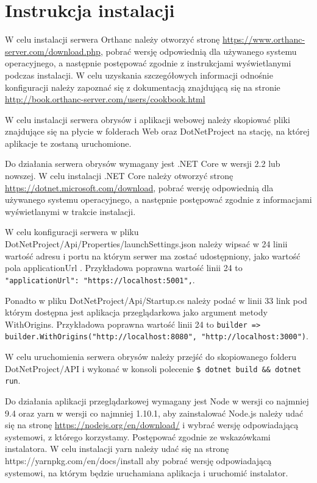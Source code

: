 \documentclass[a4paper,11pt,twoside,openright]{report}
\newcommand\blankpage{%
    \null
    \thispagestyle{empty}%
    \newpage}
\theoremstyle{definition}
\begin{document}



\afterpage{\blankpage}
\chapter*{Instrukcja instalacji}

W celu instalacji serwera Orthanc należy otworzyć stronę \url{https://www.orthanc-server.com/download.php}, pobrać wersję odpowiednią dla używanego systemu operacyjnego, a następnie postępować zgodnie z instrukcjami wyświetlanymi podczas instalacji. W celu uzyskania szczegółowych informacji odnośnie konfiguracji należy zapoznać się z dokumentacją znajdującą się na stronie \url{http://book.orthanc-server.com/users/cookbook.html}

W celu instalacji serwera obrysów i aplikacji webowej należy skopiować pliki znajdujące się na płycie w folderach Web oraz DotNetProject na stację, na której aplikacje te zostaną uruchomione.

Do działania serwera obrysów wymagany jest .NET Core w wersji 2.2 lub nowszej. W celu instalacji .NET Core należy otworzyć stronę \url{https://dotnet.microsoft.com/download}, pobrać wersję odpowiednią dla używanego systemu operacyjnego, a następnie postępować zgodnie z informacjami wyświetlanymi w trakcie instalacji.

W celu konfiguracji serwera w pliku DotNetProject/Api/Properties/launchSettings.json należy wipsać w 24 linii  wartość adresu i portu na którym serwer ma zostać udostępniony, jako wartość pola applicationUrl . Przykładowa poprawna wartość linii 24 to\texttt{ "applicationUrl": "https://localhost:5001",}.

Ponadto w pliku DotNetProject/Api/Startup.cs należy podać w linii 33 link pod którym dostępna jest aplikacja przeglądarkowa jako argument metody WithOrigins.  Przykładowa poprawna wartość linii 24 to \texttt{builder => builder.WithOrigins("http://localhost:8080", "http://localhost:3000")}.

W celu uruchomienia serwera obrysów należy przejść do skopiowanego folderu DotNetProject/API i wykonać w konsoli polecenie \texttt{\$ dotnet build \&\& dotnet run}.

Do działania aplikacji przeglądarkowej wymagany jest Node w wersji co najmniej 9.4 oraz yarn w wersji co najmniej 1.10.1, aby zainstalować Node.js należy udać się na stronę \url{https://nodejs.org/en/download/} i wybrać wersję odpowiadającą systemowi, z którego korzystamy. Postępować zgodnie ze wskazówkami instalatora. W celu instalacji yarn należy udać się na stronę https://yarnpkg.com/en/docs/install aby pobrać wersję odpowiadającą systemowi, na którym będzie uruchamiana aplikacja i uruchomić instalator.
\end{document}
